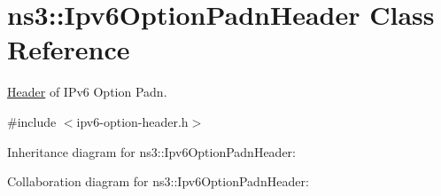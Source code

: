 \hypertarget{classns3_1_1Ipv6OptionPadnHeader}{}\section{ns3\+:\+:Ipv6\+Option\+Padn\+Header Class Reference}
\label{classns3_1_1Ipv6OptionPadnHeader}


\hyperlink{classns3_1_1Header}{Header} of I\+Pv6 Option Padn.  




{\ttfamily \#include $<$ipv6-\/option-\/header.\+h$>$}



Inheritance diagram for ns3\+:\+:Ipv6\+Option\+Padn\+Header\+:


Collaboration diagram for ns3\+:\+:Ipv6\+Option\+Padn\+Header\+:
